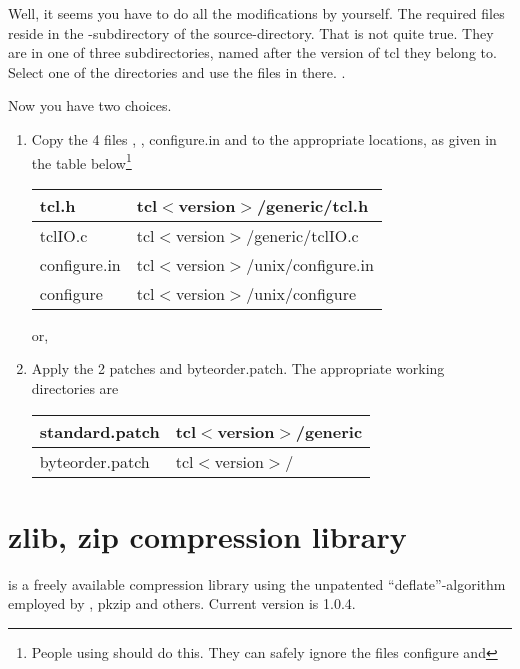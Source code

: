 Well, it seems you have to do all the modifications by yourself. The
required files reside in the -subdirectory of the
source-directory. That is not quite true. They are in one of three
subdirectories, named after the version of tcl they belong to. Select
one of the directories and use the files in there. .

Now you have two choices.

\begin {enumerate}
\item	Copy the 4 files , , \file
	{configure.in} and  to the appropriate
	locations, as given in the table below\footnote {People using
	\win{} should do this. They can safely ignore the files \file
	{configure} and }

	\begin {tabular} {|l|l|} \hline
	tcl.h		& tcl$<$version$>$/generic/tcl.h	\\ \hline
	tclIO.c		& tcl$<$version$>$/generic/tclIO.c	\\ \hline
	configure.in	& tcl$<$version$>$/unix/configure.in	\\ \hline
	configure	& tcl$<$version$>$/unix/configure	\\ \hline
	\end {tabular}

	or,

\item	Apply the 2 patches  and \file
	{byteorder.patch}. The appropriate working directories are

	\begin {tabular} {|l|l|} \hline
	standard.patch	& tcl$<$version$>$/generic	\\ \hline
	byteorder.patch	& tcl$<$version$>$/		\\ \hline
	\end {tabular}
\end   {enumerate}


\chapter {zlib, zip compression library}\label{zlib}

 is a freely available compression library using the
unpatented ``deflate''-algorithm employed by , \cmd
{pkzip} and others. Current version is 1.0.4.

